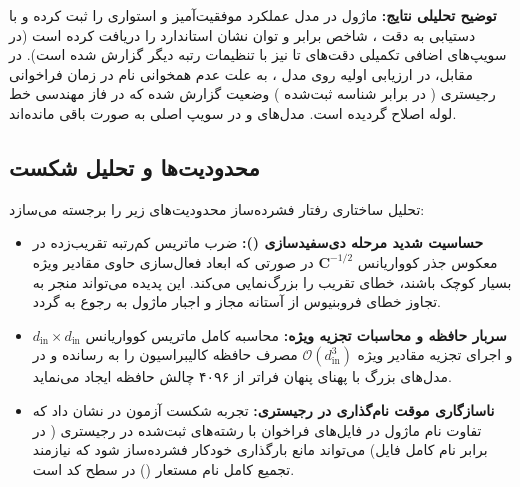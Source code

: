 \textbf{توضیح تحلیلی نتایج:} ماژول در مدل  عملکرد موفقیت‌آمیز و استواری را ثبت کرده و با دستیابی به دقت ، شاخص  برابر  و توان  نشان استاندارد  را دریافت کرده است (در سویپ‌های اضافی تکمیلی  دقت‌های تا  نیز با تنظیمات رتبه دیگر گزارش شده است). در مقابل، در ارزیابی اولیه روی مدل ، به علت عدم همخوانی نام در زمان فراخوانی رجیستری ( در برابر شناسه ثبت‌شده ) وضعیت  گزارش شده که در فاز مهندسی خط لوله اصلاح گردیده است. مدل‌های  و  در سویپ اصلی به صورت  باقی مانده‌اند.

\subsection{محدودیت‌ها و تحلیل شکست}
تحلیل ساختاری رفتار فشرده‌ساز  محدودیت‌های زیر را برجسته می‌سازد:
\begin{itemize}
    \item \textbf{حساسیت شدید مرحله دی‌سفیدسازی ():} ضرب ماتریس کم‌رتبه تقریب‌زده در معکوس جذر کوواریانس $\mathbf{C}^{-1/2}$ در صورتی که ابعاد فعال‌سازی حاوی مقادیر ویژه بسیار کوچک باشند، خطای تقریب را بزرگ‌نمایی می‌کند. این پدیده می‌تواند منجر به تجاوز خطای فروبنیوس از آستانه مجاز و اجبار ماژول به رجوع به  گردد.
    \item \textbf{سربار حافظه و محاسبات تجزیه ویژه:} محاسبه کامل ماتریس کوواریانس $d_{\text{in}} \times d_{\text{in}}$ و اجرای تجزیه مقادیر ویژه $\mathcal{O}(d_{\text{in}}^3)$ مصرف حافظه کالیبراسیون را به  رسانده و در مدل‌های بزرگ با پهنای پنهان فراتر از ۴۰۹۶ چالش حافظه ایجاد می‌نماید.
    \item \textbf{ناسازگاری موقت نام‌گذاری در رجیستری:} تجربه شکست آزمون در  نشان داد که تفاوت نام ماژول در فایل‌های فراخوان با رشته‌های ثبت‌شده در رجیستری ( در برابر نام کامل فایل) می‌تواند مانع بارگذاری خودکار فشرده‌ساز شود که نیازمند تجمیع کامل نام مستعار () در سطح کد است.
\end{itemize}
